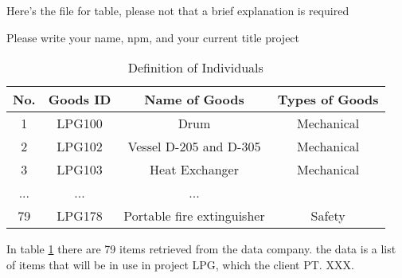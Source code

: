 Here's the file for table, please not that a brief explanation is required

Please write your name, npm, and your current title project

\begin{table}[h]
    \caption{Definition of Individuals}
    \centering
    \begin{tabular}{c c c c}
    \hline
    No. & Goods ID & Name of Goods & Types of Goods \\
    \hline
    1 & LPG100 & Drum & Mechanical \\
    2 & LPG102 & Vessel D-205 and D-305 & Mechanical \\
    3 & LPG103 & Heat Exchanger & Mechanical\\
    ... & ... & ... \\
    79 & LPG178 & Portable fire extinguisher & Safety \\
    \hline
    \end{tabular}
    \label{table}
\end{table}

\par In table \ref{table} there are 79 items retrieved from the data company. the data is a list of items that will be in use in project LPG, which the client PT. XXX. 